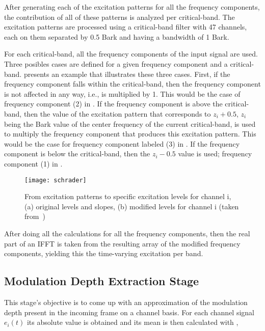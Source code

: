\documentclass[../main.tex]{subfiles}
\begin{document}
\begin{modelchapter}
After generating each of the excitation patterns for all the frequency
components, the contribution of all of these patterns is analyzed per
critical-band. The excitation patterns are processed using a critical-band
filter with 47 channels, each on them separated by 0.5 Bark and having a
bandwidth of 1 Bark.

For each critical-band, all the frequency components of the input signal are
used. Three posibles cases are defined for a given frequency component and a
critical-band.  presents an example that illustrates these
three cases. First, if the frequency component falls within the critical-band,
then the frequency component is not affected in any way, i.e., is multiplied by
1. This would be the case of frequency component (2) in . If
the frequency component is above the critical-band, then the value of the
excitation pattern that corresponds to $z_i + 0.5$, $z_i$ being the Bark value
of the center frequency of the current critical-band, is used to multiply the
frequency component that produces this excitation pattern. This would be the
case for frequency component labeled (3) in . If the
frequency component is below the critical-band, then the $z_i - 0.5$ value is
used; frequency component (1) in .

\begin{figure}[!ht]
  \centering
  \texttt{[image: schrader]}
  \caption{From excitation patterns to specific excitation levels for channel i,
    (a) original levels and slopes, (b) modified levels for channel i (taken
    from~\cite[pp.6]{Schrader2002})}
\label{fig:schrader}
\end{figure}

After doing all the calculations for all the frequency components, then the real
part of an \gls{IFFT} is taken from the resulting array of the modified
frequency components, yielding this the time-varying excitation per band.

\subsection{Modulation Depth Extraction Stage}

This stage's objective is to come up with an approximation of the modulation
depth present in the incoming frame on a channel basis. For each channel signal
$e_{i}(t)$ its absolute value is obtained and its mean is then calculated with
,


\end{modelchapter}
\end{document}
